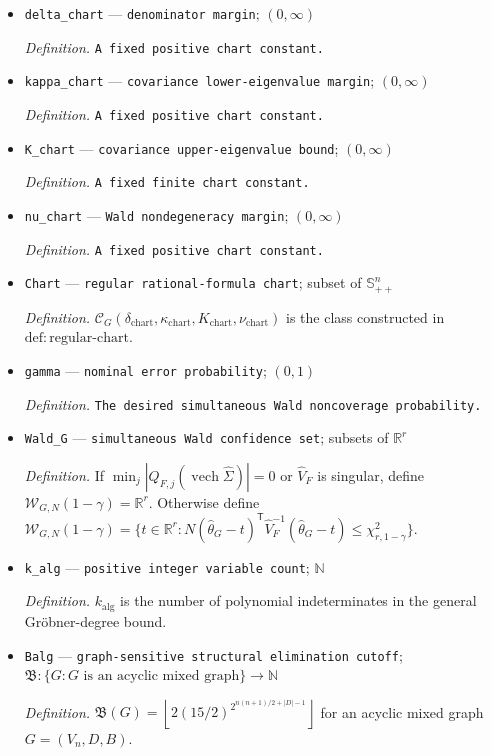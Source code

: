\documentclass{article}
\begin{document}
\begin{itemize}
  \item \texttt{delta\_\allowbreak{}chart} --- \texttt{denominator margin}; \((0,\infty)\)
  \par\smallskip\noindent\emph{Definition.} \texttt{A fixed positive chart constant.}
  \item \texttt{kappa\_\allowbreak{}chart} --- \texttt{covariance lower-\allowbreak{}eigenvalue margin}; \((0,\infty)\)
  \par\smallskip\noindent\emph{Definition.} \texttt{A fixed positive chart constant.}
  \item \texttt{K\_\allowbreak{}chart} --- \texttt{covariance upper-\allowbreak{}eigenvalue bound}; \((0,\infty)\)
  \par\smallskip\noindent\emph{Definition.} \texttt{A fixed finite chart constant.}
  \item \texttt{nu\_\allowbreak{}chart} --- \texttt{Wald nondegeneracy margin}; \((0,\infty)\)
  \par\smallskip\noindent\emph{Definition.} \texttt{A fixed positive chart constant.}
  \item \texttt{Chart} --- \texttt{regular rational-\allowbreak{}formula chart}; subset of \(\mathbb S_{++}^n\)
  \par\smallskip\noindent\emph{Definition.} \(\mathcal C_G(\delta_{\mathrm{chart}},\kappa_{\mathrm{chart}},K_{\mathrm{chart}},\nu_{\mathrm{chart}})\) is the class constructed in \(\mathrm{def:regular\mbox{-}chart}\).
  \item \texttt{gamma} --- \texttt{nominal error probability}; \((0,1)\)
  \par\smallskip\noindent\emph{Definition.} \texttt{The desired simultaneous Wald noncoverage probability.}
  \item \texttt{Wald\_\allowbreak{}G} --- \texttt{simultaneous Wald confidence set}; subsets of \(\mathbb R^r\)
  \par\smallskip\noindent\emph{Definition.} If \(\min_j|Q_{F,j}(\operatorname{vech}\widehat\Sigma)|=0\) or \(\widehat V_F\) is singular, define \(\mathcal W_{G,N}(1-\gamma)=\mathbb R^r\). Otherwise define \(\mathcal W_{G,N}(1-\gamma)=\{t\in\mathbb R^r:N(\widehat\theta_G-t)^{\mathsf T}\widehat V_F^{-1}(\widehat\theta_G-t)\le\chi^2_{r,1-\gamma}\}\).
  \item \texttt{k\_\allowbreak{}alg} --- \texttt{positive integer variable count}; \(\mathbb N\)
  \par\smallskip\noindent\emph{Definition.} \(k_{\mathrm{alg}}\) is the number of polynomial indeterminates in the general Gr\"obner-degree bound.
  \item \texttt{Balg} --- \texttt{graph-\allowbreak{}sensitive structural elimination cutoff}; \(\mathfrak B:\{G:G\text{ is an acyclic mixed graph}\}\to\mathbb N\)
  \par\smallskip\noindent\emph{Definition.} \(\mathfrak B(G)=\left\lfloor2(15/2)^{2^{n(n+1)/2+|D|-1}}\right\rfloor\) for an acyclic mixed graph \(G=(V_n,D,B)\).
\end{itemize}
\end{document}
